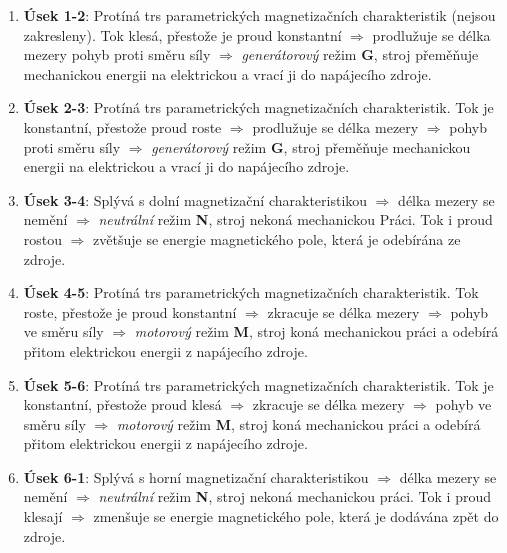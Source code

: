       \begin{enumerate}[noitemsep]
        \item \textbf{Úsek 1-2}: Protíná trs parametrických magnetizačních charakteristik (nejsou 
          zakresleny). Tok klesá, přestože je proud konstantní \(\Rightarrow\) prodlužuje se délka 
          mezery pohyb proti směru síly \(\Rightarrow\) \emph{generátorový} režim \textbf{G}, stroj 
          přeměňuje mechanickou energii na elektrickou a vrací ji do napájecího zdroje.
        
        \item \textbf{Úsek 2-3}: Protíná trs parametrických magnetizačních charakteristik. Tok je 
          konstantní, přestože proud roste \(\Rightarrow\) prodlužuje se délka mezery 
          \(\Rightarrow\) pohyb proti směru síly \(\Rightarrow\) \emph{generátorový} režim 
          \textbf{G}, stroj přeměňuje mechanickou energii na elektrickou a vrací ji do napájecího 
          zdroje.
   
        \item \textbf{Úsek 3-4}: Splývá s dolní magnetizační charakteristikou \(\Rightarrow\) délka 
          mezery se nemění \(\Rightarrow\) \emph{neutrální} režim \textbf{N}, stroj nekoná 
          mechanickou Práci. Tok i proud rostou \(\Rightarrow\) zvětšuje se energie magnetického 
          pole, která je odebírána ze zdroje. 
        
        \item \textbf{Úsek 4-5}: Protíná trs parametrických magnetizačních charakteristik. Tok 
          roste, přestože je proud konstantní \(\Rightarrow\) zkracuje se délka mezery 
          \(\Rightarrow\) pohyb ve směru síly \(\Rightarrow\) \emph{motorový} režim \textbf{M}, 
          stroj koná mechanickou práci a odebírá přitom elektrickou energii z napájecího zdroje.
        
        \item \textbf{Úsek 5-6}: Protíná trs parametrických magnetizačních charakteristik. Tok je 
          konstantní, přestože proud klesá \(\Rightarrow\) zkracuje se délka mezery \(\Rightarrow\) 
          pohyb ve směru síly \(\Rightarrow\) \emph{motorový} režim \textbf{M}, stroj koná 
          mechanickou práci a odebírá přitom elektrickou energii z napájecího zdroje.
        
        \item \textbf{Úsek 6-1}: Splývá s horní magnetizační charakteristikou \(\Rightarrow\) délka 
          mezery se nemění \(\Rightarrow\) \emph{neutrální} režim \textbf{N}, stroj nekoná 
          mechanickou práci. Tok i proud klesají \(\Rightarrow\) zmenšuje se energie magnetického 
          pole, která je dodávána zpět do zdroje.
      \end{enumerate}
      

